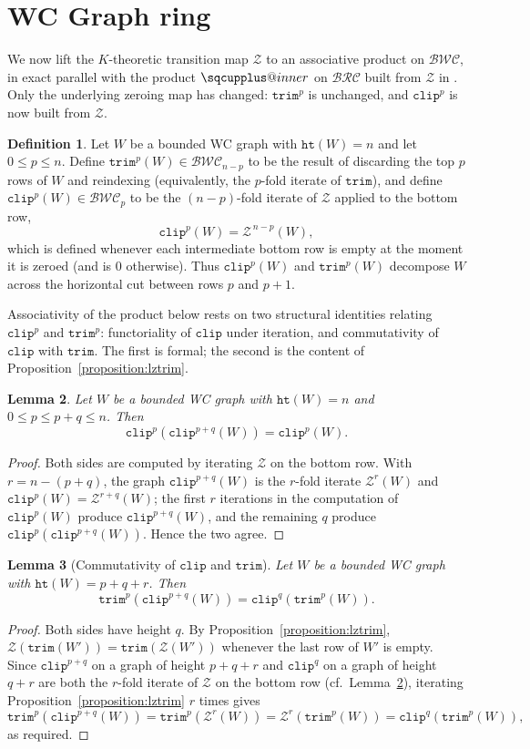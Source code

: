 \documentclass{amsart}
\makeatletter
\newcommand{\sqcupplus@inner}[2]{%
  \vcenter{\hbox{\ooalign{%
    \hfil$\m@th#1\sqcup$\hfil\cr
    \hfil\raisebox{0.15ex}{$\m@th#1\scriptscriptstyle+$}\hfil\cr
  }}}%
}
\newcommand{\sqcupplus}{\mathbin{\mathpalette\sqcupplus@inner\relax}}
\newtheorem{lemma}{Lemma}[section]
\theoremstyle{definition}
\newtheorem{definition}[lemma]{Definition}
\theoremstyle{remark}
\numberwithin{equation}{subsection}
\newcommand{\trm}{\mathtt{trim}}
\newcommand{\zeromap}{\mathcal{Z}}
\newcommand{\hr}{\mathtt{ht}}
\newcommand{\clp}{\mathtt{clip}}
\newcommand{\BRC}{\mathcal{BRC}}
\newcommand{\BWC}{\mathcal{BWC}}
\newcommand{\lzeromap}{\mathscr{Z}}
\makeatother
\begin{document}
\section{WC Graph ring}

We now lift the $K$-theoretic transition map $\lzeromap$ to an associative
product on $\BWC$, in exact parallel with the product $\sqcupplus$ on $\BRC$
built from $\zeromap$ in \cite{samuelmolev}. Only the underlying zeroing map has
changed: $\trm^p$ is unchanged, and $\clp^p$ is now built from $\lzeromap$.

\begin{definition}\label{definition:kcliptrim}
Let $W$ be a bounded WC graph with $\hr(W)=n$ and let $0\leq p\leq n$. Define
$\trm^p(W)\in\BWC_{n-p}$ to be the result of discarding the top $p$ rows of $W$
and reindexing (equivalently, the $p$-fold iterate of $\trm$), and define
$\clp^p(W)\in\BWC_{p}$ to be the $(n-p)$-fold iterate of $\lzeromap$ applied to
the bottom row,
$$\clp^p(W)=\lzeromap^{\,n-p}(W),$$
which is defined whenever each intermediate bottom row is empty at the moment it
is zeroed (and is $0$ otherwise). Thus $\clp^p(W)$ and $\trm^p(W)$ decompose $W$
across the horizontal cut between rows $p$ and $p+1$.
\end{definition}

Associativity of the product below rests on two structural identities relating
$\clp^p$ and $\trm^p$: functoriality of $\clp$ under iteration, and commutativity
of $\clp$ with $\trm$. The first is formal; the second is the content of
Proposition~\ref{proposition:lztrim}.

\begin{lemma}\label{lemma:kclpfunc}
Let $W$ be a bounded WC graph with $\hr(W)=n$ and $0\leq p\leq p+q\leq n$. Then
$$\clp^p(\clp^{p+q}(W))=\clp^p(W).$$
\end{lemma}
\begin{proof}
Both sides are computed by iterating $\lzeromap$ on the bottom row. With
$r=n-(p+q)$, the graph $\clp^{p+q}(W)$ is the $r$-fold iterate $\lzeromap^{r}(W)$
and $\clp^p(W)=\lzeromap^{r+q}(W)$; the first $r$ iterations in the computation
of $\clp^p(W)$ produce $\clp^{p+q}(W)$, and the remaining $q$ produce
$\clp^p(\clp^{p+q}(W))$. Hence the two agree.
\end{proof}

\begin{lemma}[Commutativity of $\clp$ and $\trm$]\label{lemma:kclptrm}
Let $W$ be a bounded WC graph with $\hr(W)=p+q+r$. Then
$$\trm^p(\clp^{p+q}(W))=\clp^q(\trm^p(W)).$$
\end{lemma}
\begin{proof}
Both sides have height $q$. By Proposition~\ref{proposition:lztrim},
$\lzeromap(\trm(W'))=\trm(\lzeromap(W'))$ whenever the last row of $W'$ is empty.
Since $\clp^{p+q}$ on a graph of height $p+q+r$ and $\clp^q$ on a graph of height
$q+r$ are both the $r$-fold iterate of $\lzeromap$ on the bottom row
(cf.\ Lemma~\ref{lemma:kclpfunc}), iterating
Proposition~\ref{proposition:lztrim} $r$ times gives
$$\trm^p(\clp^{p+q}(W))=\trm^p(\lzeromap^{r}(W))=\lzeromap^{r}(\trm^p(W))=\clp^q(\trm^p(W)),$$
as required.
\end{proof}
\end{document}
